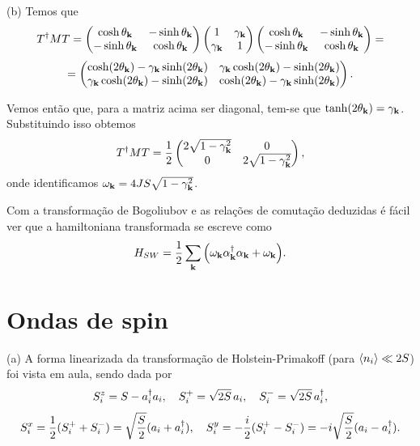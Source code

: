 \documentclass[a4paper,10pt]{article}
\begin{document}
\n

(b) Temos que
$$
T^\dagger M T =
\begin{pmatrix}
\cosh\theta_{\vb{k}} & -\sinh\theta_{\vb{k}} \\
-\sinh\theta_{\vb{k}} & \cosh\theta_{\vb{k}}
\end{pmatrix}
\begin{pmatrix}
1 & \gamma_{\vb{k}} \\
\gamma_{\vb{k}} & 1
\end{pmatrix}
\begin{pmatrix}
\cosh\theta_{\vb{k}} & -\sinh\theta_{\vb{k}} \\
-\sinh\theta_{\vb{k}} & \cosh\theta_{\vb{k}}
\end{pmatrix}
=
$$
$$
=
\begin{pmatrix}
\cosh(2\theta_{\vb{k}}) - \gamma_{\vb{k}}\sinh(2\theta_{\vb{k}}) & \gamma_{\vb{k}}\cosh(2\theta_{\vb{k}}) - \sinh(2\theta_{\vb{k}}) \\
\gamma_{\vb{k}}\cosh(2\theta_{\vb{k}}) - \sinh(2\theta_{\vb{k}}) & \cosh(2\theta_{\vb{k}}) - \gamma_{\vb{k}}\sinh(2\theta_{\vb{k}})
\end{pmatrix}.
$$

Vemos então que, para a matriz acima ser diagonal, tem-se que $\tanh(2\theta_{\vb{k}}) = \gamma_{\vb{k}}$. Substituindo isso obtemos
$$
T^\dagger M T =
\frac{1}{2}
\begin{pmatrix}
2\sqrt{1-\gamma_{\vb{k}}^2} & 0 \\
0 & 2\sqrt{1-\gamma_{\vb{k}}^2}
\end{pmatrix},
$$
onde identificamos $\omega_{\vb{k}} = 4JS \sqrt{1-\gamma_{\vb{k}}^2}$.

Com a transformação de Bogoliubov e as relações de comutação deduzidas é fácil ver que a hamiltoniana transformada se escreve como
$$
H_{SW} = \frac{1}{2} \sum_{\vb{k}} \qty(\omega_{\vb{k}} \alpha_{\vb{k}}^\dagger \alpha_{\vb{k}} + \omega_{\vb{k}}).
$$


\pagebreak

\section{Ondas de spin}

(a) A forma linearizada da transformação de Holstein-Primakoff (para $\ev{n_i} \ll 2S$) foi vista em aula, sendo dada por
$$
S_i^z = S - a_i^\dagger a_i, \quad
S_i^+ = \sqrt{2S} \, a_i, \quad
S_i^- = \sqrt{2S} \, a_i^\dagger,
$$
$$
S_i^x = \frac{1}{2} (S_i^+ + S_i^-) = \sqrt{\frac{S}{2}} (a_i+a_i^\dagger), \quad
S_i^y = -\frac{i}{2} (S_i^+ - S_i^-) = -i\sqrt{\frac{S}{2}} (a_i-a_i^\dagger).
$$
\end{document}
